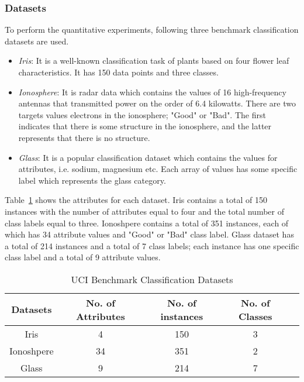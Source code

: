 \documentclass[english]{tktltiki2}
\theoremstyle{definition}
\theoremstyle{remark}
\begin{document}
\subsubsection{Datasets}
To perform the quantitative experiments, following three benchmark classification datasets are used.
\begin{center}
	\begin{itemize}
		\item \textit{Iris}: It is a well-known classification task of plants based on four flower leaf characteristics. It has 150 data points and three classes.
		\item \textit{Ionosphere}: It is radar data which contains the values of 16 high-frequency antennas that transmitted power on the order of 6.4 kilowatts. There are two targets values electrons in the ionosphere; "Good" or "Bad". The first indicates that there is some structure in the ionosphere, and the latter represents that there is no structure.
		\item \textit{Glass}: It is a popular classification dataset which contains the values for attributes, i.e. sodium, magnesium etc. 
		Each array of values has some specific label which represents the glass category.
	\end{itemize}
\end{center}

Table~\ref{table:datasets_UCI} shows the attributes for each dataset. Iris contains a total of 150 instances with the number of attributes equal to four and the total number of class labels equal to three. Ionoshpere contains a total of 351 instances, each of which has 34 attribute values and "Good" or "Bad" class label. Glass dataset has a total of 214 instances and a total of 7 class labels; each instance has one specific class label and a total of 9 attribute values.

\begin{table}[H]
	\caption{UCI Benchmark Classification Datasets}
	\label{table:datasets_UCI}
	\begin{center}
	\begin{tabular}{|c|c|c|c|c|}
		\hline	
		\textbf{Datasets} & \textbf{No. of Attributes} & \textbf{No. of instances} & \textbf{No. of Classes} \\ \hline
		
		Iris  & 4 & 150 & 3 \\ \hline
		Ionoshpere  & 34 & 351 & 2 \\ \hline
		Glass  & 9 & 214 & 7 \\ \hline
	\end{tabular}
	\end{center}
\end{table}
\end{document}
